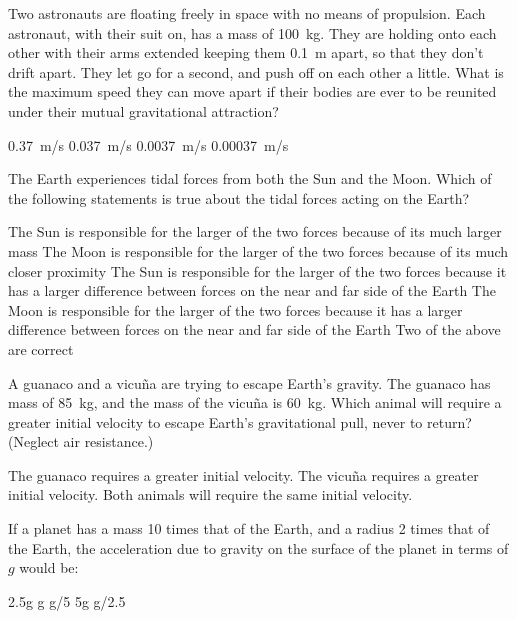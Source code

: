\question Two astronauts are floating freely in space with no means of propulsion.  Each astronaut, with their suit on, has a mass of \SI{100}{kg}.  They are holding onto each other with their arms extended keeping them \SI{.1}{m} apart, so that they don't drift apart.  They let go for a second, and push off on each other a little.  What is the maximum speed they can move apart if their bodies are ever to be reunited under their mutual gravitational attraction?
\begin{checkboxes}
\choice \SI{0.37}{m/s}
\choice \SI{0.037}{m/s}
\choice \SI{0.0037}{m/s}
\CorrectChoice \SI{0.00037}{m/s} \correct
\end{checkboxes}

\question The Earth experiences tidal forces from both the Sun and the Moon. Which of the following statements is true about the tidal forces acting on the Earth?
\begin{checkboxes}
\choice The Sun is responsible for the larger of the two forces because of its much larger mass
\choice The Moon is responsible for the larger of the two forces because of its much closer proximity
\choice The Sun is responsible for the larger of the two forces because it has a larger difference between forces on the near and far side of the Earth
\CorrectChoice The Moon is responsible for the larger of the two forces because it has a larger difference between forces on the near and far side of the Earth \correct
\choice Two of the above are correct
\end{checkboxes}

\question A guanaco and a vicu\~na are trying to escape Earth's gravity. The guanaco has mass of \SI{85}{kg}, and the mass of the vicu\~na is \SI{60}{kg}. Which animal will require a greater initial velocity to escape Earth's gravitational pull, never to return? (Neglect air resistance.)
\begin{checkboxes}
\choice The guanaco requires a greater initial velocity.
\choice The vicu\~na requires a greater initial velocity.
\CorrectChoice Both animals will require the same initial velocity. \correct
\end{checkboxes}

\question If a planet has a mass 10 times that of the Earth, and a radius 2 times that of the Earth, the acceleration due to gravity on the surface of the planet in terms of $g$ would be:
\begin{checkboxes}
\CorrectChoice 2.5g \correct
\choice g
\choice g/5
\choice 5g
\choice g/2.5
\end{checkboxes}


